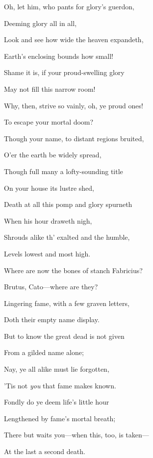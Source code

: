 Oh, let him, who pants for glory's guerdon,

Deeming glory all in all,

Look and see how wide the heaven expandeth,

Earth's enclosing bounds how small!

Shame it is, if your proud-swelling glory

May not fill this narrow room!

Why, then, strive so vainly, oh, ye proud ones!

To escape your mortal doom?

Though your name, to distant regions bruited,

O'er the earth be widely spread,

Though full many a lofty-sounding title

On your house its lustre shed,

Death at all this pomp and glory spurneth

When his hour draweth nigh,

Shrouds alike th' exalted and the humble,

Levels lowest and most high.

Where are now the bones of stanch Fabricius?

Brutus, Cato—where are they?

Lingering fame, with a few graven letters,

Doth their empty name display.

But to know the great dead is not given

From a gilded name alone;

Nay, ye all alike must lie forgotten,

'Tis not \emph{you} that fame makes known.

Fondly do ye deem life's little hour

Lengthened by fame's mortal breath;

There but waits you—when this, too, is taken—

At the last a second death.


